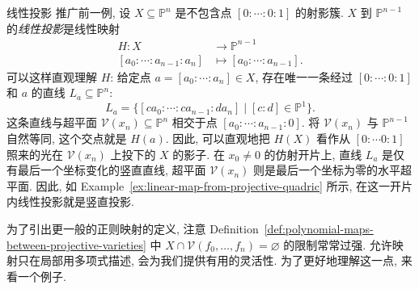 \begin{Example}{线性投影}\leavevmode\label{ex:linear-projections-of-projective-varieties}
推广前一例, 设 $X\subseteq\mathbb{P}^{n}$ 是不包含点 $[0:\cdots:0:1]$ 的射影簇. $X$ 到 $\mathbb{P}^{n-1}$ 的\emph{线性投影}是线性映射
\[
  \begin{aligned}
    H:X&\to\mathbb{P}^{n-1}\\
    [a_{0}:\cdots:a_{n-1}:a_{n}]&\mapsto[a_{0}:\cdots:a_{n-1}].
  \end{aligned}
\]
可以这样直观理解 $H$: 给定点 $a=[a_{0}:\cdots:a_{n}]\in X$, 存在唯一一条经过 $[0:\cdots:0:1]$ 和 $a$ 的直线 $L_{a}\subseteq\mathbb{P}^{n}$:
\[
  L_{a}=\{[ca_{0}:\cdots:ca_{n-1}:da_{n}]\mid[c:d]\in\mathbb{P}^{1}\}.
\]
这条直线与超平面 $\mathcal{V}(x_{n})\subseteq\mathbb{P}^{n}$ 相交于点 $[a_{0}:\cdots:a_{n-1}:0]$. 将 $\mathcal{V}(x_{n})$ 与 $\mathbb{P}^{n-1}$ 自然等同, 这个交点就是 $H(a)$. 因此, 可以直观地把 $H(X)$ 看作从 $[0:\cdots 0:1]$ 照来的光在 $\mathcal{V}(x_{n})$ 上投下的 $X$ 的影子. 在 $x_{0}\ne0$ 的仿射开片上, 直线 $L_{a}$ 是仅有最后一个坐标变化的\textquotedbl{}竖直\textquotedbl{}直线, 超平面 $\mathcal{V}(x_{n})$ 则是最后一个坐标为零的\textquotedbl{}水平\textquotedbl{}超平面. 因此, 如 Example~\ref{ex:linear-map-from-projective-quadric} 所示, 在这一开片内线性投影就是竖直投影.
\end{Example}

为了引出更一般的正则映射的定义, 注意 Definition~\ref{def:polynomial-maps-between-projective-varieties} 中 $X\cap\mathcal{V}(f_{0},\ldots,f_{n})=\varnothing$ 的限制常常过强. 允许映射只在\textquotedbl{}局部\textquotedbl{}用多项式描述, 会为我们提供有用的灵活性. 为了更好地理解这一点, 来看一个例子.

